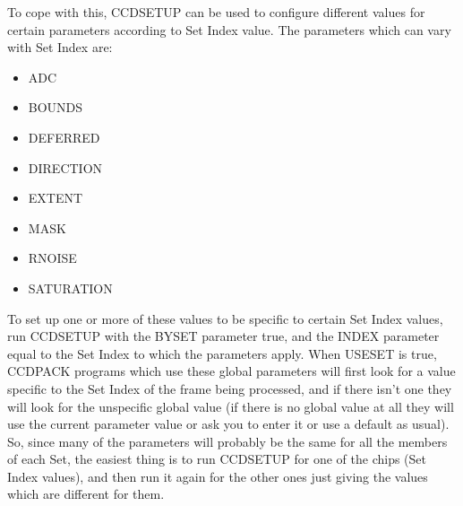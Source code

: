 \documentclass[twoside,11pt]{article}
\renewcommand{\_}{\texttt{\symbol{95}}}
\newcommand{\routine}[1]{{\sc #1}}
\begin{document}
To cope with this, \routine{CCDSETUP} can be used to configure 
different values for certain parameters according to Set Index value.
The parameters which can vary with Set Index are:
\begin{itemize}
\item ADC
\item BOUNDS
\item DEFERRED
\item DIRECTION
\item EXTENT
\item MASK
\item RNOISE
\item SATURATION
\end{itemize}
To set up one or more of these values to be specific to 
certain Set Index values, run \routine{CCDSETUP} with the
BYSET parameter true, and the INDEX parameter equal to the 
Set Index to which the parameters apply.
When USESET is true, CCDPACK programs which use these global 
parameters will first look for a value specific to the Set Index
of the frame being processed, and if there isn't one they will
look for the unspecific global value (if there is no global 
value at all they will use the current parameter value or ask
you to enter it or use a default as usual).
So, since many of the parameters will probably be the same for all
the members of each Set, the easiest thing is to run CCDSETUP 
for one of the chips (Set Index values), and then run it again 
for the other ones
just giving the values which are different for them.
\end{document}
